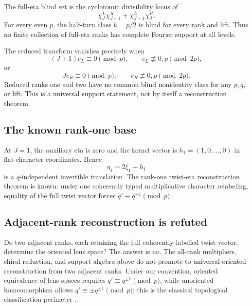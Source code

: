 \documentclass[11pt]{article}
\theoremstyle{definition}
\newcommand{\etaInv}{\eta}
\begin{document}
The full-eta blind set is the cyclotomic divisibility locus of
\[
 \chi_J^L\chi_{J-1}^R+\chi_{J-1}^L\chi_J^R.
\]
For every even $p$, the half-turn class $k=p/2$ is blind for every rank and
lift.  Thus no finite collection of full-eta ranks has complete Fourier
support at all levels.

The reduced transform vanishes precisely when
\[
 (J+1)e_L\equiv0\pmod p,
 \qquad e_L\not\equiv0,p\pmod{2p},
\]
or
\[
 Je_R\equiv0\pmod p,
 \qquad e_R\not\equiv0,p\pmod{2p}.
\]
Reduced ranks one and two have no common blind nonidentity class for any
$p,q$, or lift.  This is a universal support statement, not by itself a
reconstruction theorem.

\subsection{The known rank-one base}

At $J=1$, the auxiliary eta is zero and the kernel vector is
$h_1=(1,0,\ldots,0)$ in flat-character coordinates.  Hence
\[
 \etaInv_1=2\xi_1-h_1
\]
is a $q$-independent invertible translation.  The rank-one twist-eta
reconstruction theorem is known: under one coherently typed multiplicative
character relabeling, equality of the full twist vector forces
$q'\equiv q^{\pm1}\pmod p$
\cite[pp.~23--24, Thm.~2.1; pp.~34--35, Thm.~4.3]{Katase1990}.

\subsection{Adjacent-rank reconstruction is refuted}

Do two adjacent ranks, each retaining the full coherently labelled twist
vector, determine the oriented lens space?  The answer is no.
The all-rank multipliers, chiral reduction, and support algebra above do not
promote to universal oriented reconstruction from two adjacent ranks.  Under
our convention, oriented equivalence of lens spaces requires
$q'\equiv q^{\pm1}\pmod p$, while unoriented homeomorphism allows
$q'\equiv\pm q^{\pm1}\pmod p$; this is the classical topological
classification perimeter \cite{Brody1960}.
\end{document}
